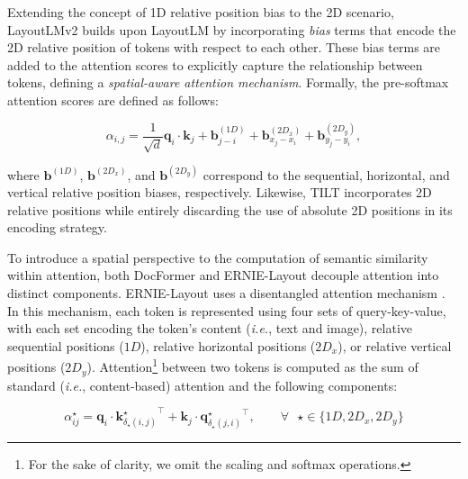 Extending the concept of 1D relative position bias \citep{raffel2020exploring} to the 2D scenario, LayoutLMv2 \citep{xu2020layoutlmv2} builds upon LayoutLM by incorporating \textit{bias} terms that encode the 2D relative position of tokens with respect to each other. These bias terms are added to the attention scores to explicitly capture the relationship between tokens, defining a \textit{spatial-aware attention mechanism}. Formally, the pre-softmax attention scores are defined as follows:

\begin{equation}
    \alpha_{i,j} = \dfrac{1}{\sqrt{d}} \bm{q}_i \cdot \bm{k}_j + \bm{b}^{(1D)}_{j - i} + \bm{b}^{(2D_x)}_{x_j - x_i} + \bm{b}^{(2D_y)}_{y_j - y_i},
\end{equation}

\noindent where $\bm{b}^{(1D)}$, $\bm{b}^{(2D_x)}$, and $\bm{b}^{(2D_y)}$ correspond to the sequential, horizontal, and vertical relative position biases, respectively. Likewise, TILT \citep{powalski2021going} incorporates 2D relative positions while entirely discarding the use of absolute 2D positions in its encoding strategy. 

To introduce a spatial perspective to the computation of semantic similarity within attention, both DocFormer \citep{appalaraju2021docformer} and ERNIE-Layout \citep{peng2022ernie} decouple attention into distinct components. 
ERNIE-Layout uses a disentangled attention mechanism \citep{he2020deberta}. In this mechanism, each token is represented using four sets of query-key-value, with each set encoding the token's content (\textit{i.e.}, text and image), relative sequential positions ($1D$), relative horizontal positions ($2D_x$), or relative vertical positions ($2D_y$). Attention\footnote{For the sake of clarity, we omit the scaling and softmax operations.} between two tokens is computed as the sum of standard (\textit{i.e.}, content-based) attention and the following components: 

\begin{equation}
        \alpha^{\star}_{ij} = \bm{q}_i \cdot {\bm{k}^{\star}_{\delta_{\star}(i, j)}}^{\top} + \bm{k}_j \cdot {\bm{q}^{\star}_{\delta_{\star}(j, i)}}^{\top}, \qquad \forall \text{ } \star \in \{1D, 2D_x, 2D_y\}
\label{equation:ernie-layout-attention}
\end{equation}


